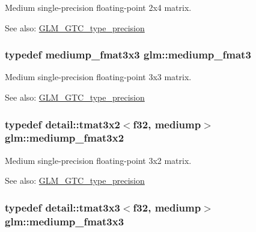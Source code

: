Medium single-precision floating-point 2x4 matrix. \begin{Desc}
\item[See also:]\hyperlink{group__gtc__type__precision}{GLM\_\-GTC\_\-type\_\-precision} \end{Desc}
\hypertarget{group__gtc__type__precision_g85f2267401434ea8c5463af040f0760c}{
\subsubsection[mediump\_\-fmat3]{\setlength{\rightskip}{0pt plus 5cm}typedef mediump\_\-fmat3x3 {\bf glm::mediump\_\-fmat3}}}
\label{group__gtc__type__precision_g85f2267401434ea8c5463af040f0760c}


Medium single-precision floating-point 3x3 matrix. \begin{Desc}
\item[See also:]\hyperlink{group__gtc__type__precision}{GLM\_\-GTC\_\-type\_\-precision} \end{Desc}
\hypertarget{group__gtc__type__precision_g40681f25413b8705b16da2f534692f59}{
\subsubsection[mediump\_\-fmat3x2]{\setlength{\rightskip}{0pt plus 5cm}typedef detail::tmat3x2$<$f32, mediump$>$ {\bf glm::mediump\_\-fmat3x2}}}
\label{group__gtc__type__precision_g40681f25413b8705b16da2f534692f59}


Medium single-precision floating-point 3x2 matrix. \begin{Desc}
\item[See also:]\hyperlink{group__gtc__type__precision}{GLM\_\-GTC\_\-type\_\-precision} \end{Desc}
\hypertarget{group__gtc__type__precision_ga7f015dd5b962a658178bb881d4620cc}{
\subsubsection[mediump\_\-fmat3x3]{\setlength{\rightskip}{0pt plus 5cm}typedef detail::tmat3x3$<$f32, mediump$>$ {\bf glm::mediump\_\-fmat3x3}}}
\label{group__gtc__type__precision_ga7f015dd5b962a658178bb881d4620cc}


